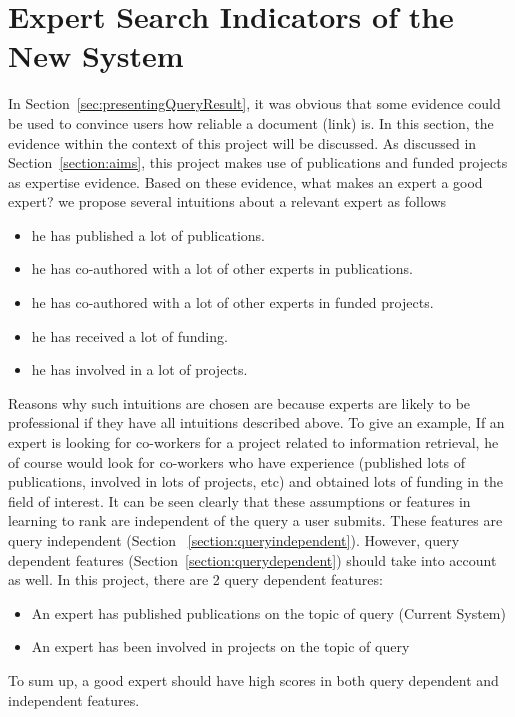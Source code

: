 \section{Expert Search Indicators of the New System}\label{section:goodexpert}
In Section~\ref{sec:presentingQueryResult}, it was obvious that some evidence could be used to convince users how reliable a document (link) is.
In this section, the evidence within
the context of this project will be discussed. As discussed in Section~\ref{section:aims}, this project makes use of publications and funded projects as 
expertise evidence. Based on these evidence, what makes an expert a good expert? we propose several intuitions about a relevant expert as follows 
\begin{itemize}
 \item he has published a lot of publications.
 \item he has co-authored with a lot of other experts in publications.
 \item he has co-authored with a lot of other experts in funded projects.
 \item he has received a lot of funding.
 \item he has involved in a lot of projects.
\end{itemize}

Reasons why such intuitions are chosen are because experts are likely to be professional if they have all intuitions described above. To give an example,
If an expert is looking for co-workers for a project related to information retrieval, he of course would look for co-workers who have experience 
(published lots of publications, involved in lots of projects, etc) and obtained lots of funding in the field of interest.
It can be seen clearly that these assumptions or features in learning to rank are independent of the query a user submits. These features are query independent
(Section ~\ref{section:queryindependent}). However, query dependent features (Section~\ref{section:querydependent}) should take into account as well. 
In this project, there are 2 query dependent features: 
\begin{itemize}
 \item An expert has published publications on the topic of query (Current System)
 \item An expert has been involved in projects on the topic of query
\end{itemize}

To sum up, a good expert should have high scores in both query dependent and independent features.


